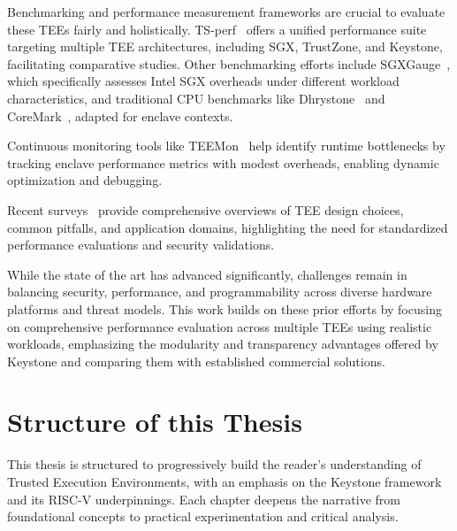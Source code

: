 Benchmarking and performance measurement frameworks are crucial to evaluate these TEEs fairly and holistically. TS-perf~\cite{suzaki2021ts} offers a unified performance suite targeting multiple TEE architectures, including SGX, TrustZone, and Keystone, facilitating comparative studies. Other benchmarking efforts include SGXGauge~\cite{kumar2022sgxgauge}, which specifically assesses Intel SGX overheads under different workload characteristics, and traditional CPU benchmarks like Dhrystone~\cite{weiss2002dhrystone, york2002benchmarking} and CoreMark~\cite{gal2012exploring}, adapted for enclave contexts.

Continuous monitoring tools like TEEMon~\cite{krahn2020teemon} help identify runtime bottlenecks by tracking enclave performance metrics with modest overheads, enabling dynamic optimization and debugging.

Recent surveys~\cite{Survey2023, turn0search5} provide comprehensive overviews of TEE design choices, common pitfalls, and application domains, highlighting the need for standardized performance evaluations and security validations.

While the state of the art has advanced significantly, challenges remain in balancing security, performance, and programmability across diverse hardware platforms and threat models. This work builds on these prior efforts by focusing on comprehensive performance evaluation across multiple TEEs using realistic workloads, emphasizing the modularity and transparency advantages offered by Keystone and comparing them with established commercial solutions.

\section{Structure of this Thesis}

This thesis is structured to progressively build the reader’s understanding of Trusted Execution Environments, with an emphasis on the Keystone framework and its RISC-V underpinnings. Each chapter deepens the narrative from foundational concepts to practical experimentation and critical analysis.

